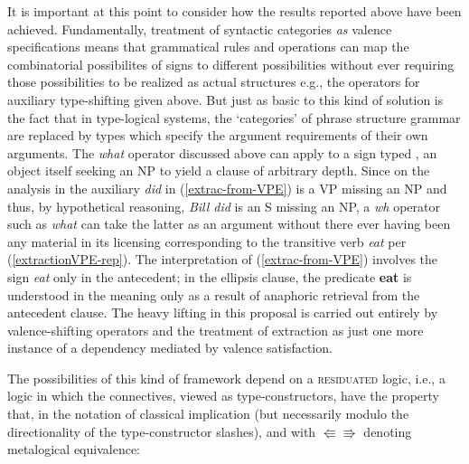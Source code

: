 \documentclass[output=paper,colorlinks,citecolor=brown]{langscibook}
\begin{document}
It is important at this point to consider how the results reported
above have been achieved. Fundamentally, treatment of syntactic
categories \textsl{as} valence specifications means that grammatical
rules and operations can map the combinatorial possibilites of signs
to different possibilities without ever requiring those possibilities
to be realized as actual structures e.g., the operators for auxiliary
type-shifting given above. But just as basic to this kind of solution
is the fact that in type-logical systems, the `categories' of phrase
structure grammar are replaced by types which specify the argument
requirements of their own arguments. The \textit{what} operator discussed
above can apply to a sign typed , an object itself seeking an NP
to yield a clause of arbitrary depth. Since on the analysis in
 the auxiliary \textit{did} in (\ref{extrac-from-VPE}) is a VP
missing an NP and thus, by hypothetical reasoning, \textit{Bill did} is an S
missing an NP, a \textit{wh} operator such as \textit{what} can take the latter as
an argument without there ever having been any material in its
licensing corresponding to the transitive verb \textit{eat} per
(\ref{extractionVPE-rep}). The interpretation of (\ref{extrac-from-VPE}) involves
the sign \textit{eat} only in the antecedent; in the ellipsis clause, the
predicate \textbf{eat} is understood in the meaning only as a result of
anaphoric retrieval from the antecedent clause. The heavy lifting in
this proposal is carried out entirely by valence-shifting operators
and the treatment of extraction as just one more instance of a
dependency mediated by valence satisfaction.

The possibilities of this kind of framework depend on a \textsc{residuated}
logic, i.e., a logic in which the connectives, viewed as
type-constructors, have the property that, in the notation of
classical implication (but necessarily modulo the directionality of the
type-constructor slashes), and with $\Lleftarrow\!\Rrightarrow$
denoting metalogical equivalence:
\end{document}

